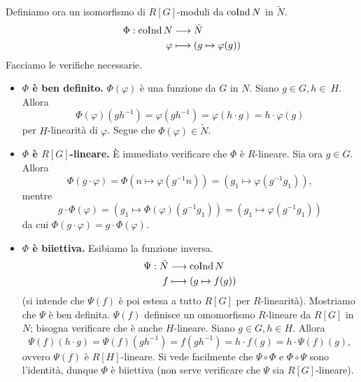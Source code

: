 \documentclass[a4paper]{article}
\begin{document}
Definiamo ora un isomorfismo di $R[G]$-moduli da $\operatorname{coInd} N$ in $\tilde{N}$.
\begin{alignat*}{1}
\Phi:\operatorname{coInd} N&\longrightarrow\tilde{N}\\
\varphi&\longmapsto(g\mapsto\varphi(g))
\end{alignat*}
Facciamo le verifiche necessarie.
\begin{itemize}
\item\textbf{$\Phi$ è ben definito.} $\Phi(\varphi)$ è una funzione da $G$ in $N$. Siano $g\in G\comma h\in\ H$. Allora
$$
\Phi(\varphi)(gh^{-1})=\varphi(gh^{-1})=\varphi(h\cdot g)=h\cdot\varphi(g)
$$
per $H$-linearità di $\varphi$. Segue che $\Phi(\varphi)\in\tilde{N}$.
\item\textbf{$\Phi$ è $R[G]$-lineare.} È immediato verificare che $\Phi$ è $R$-lineare. Sia ora $g\in G$. Allora
$$
\Phi(g\cdot\varphi)=\Phi(n\mapsto\varphi(g^{-1}n))=(g_1\mapsto\varphi(g^{-1}g_1)),
$$
mentre
$$
g\cdot\Phi(\varphi)=(g_1\mapsto\Phi(\varphi)(g^{-1}g_1))=(g_1\mapsto\varphi(g^{-1}g_1))
$$
da cui $\Phi(g\cdot\varphi)=g\cdot\Phi(\varphi)$.
\item\textbf{$\Phi$ è biiettiva.} Esibiamo la funzione inversa.
\begin{alignat*}{1}
\Psi:\tilde{N}&\longrightarrow\operatorname{coInd} N\\
f&\longmapsto(g\mapsto f(g))
\end{alignat*}
(si intende che $\Psi(f)$ è poi estesa a tutto $R[G]$ per $R$-linearità). Mostriamo che $\Psi$ è ben definita. $\Psi(f)$ definisce un omomorfismo $R$-lineare da $R[G]$ in $N$; bisogna verificare che è anche $H$-lineare. Siano $g\in G\comma h\in H$. Allora
$$
\Psi(f)(h\cdot g)=\Psi(f)(gh^{-1})=f(gh^{-1})=h\cdot f(g)=h\cdot\Psi(f)(g),
$$
ovvero $\Psi(f)$ è $R[H]$-lineare. Si vede facilmente che $\Psi\circ\Phi$ e $\Phi\circ\Psi$ sono l'identità, dunque $\Phi$ è biiettiva (non serve verificare che $\Psi$ sia $R[G]$-lineare).
\end{itemize}
\end{document}
